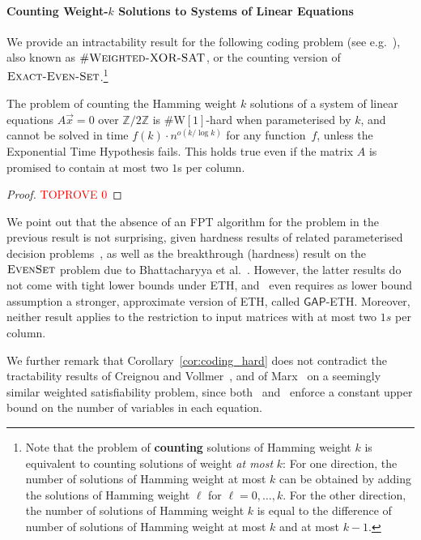\documentclass[authorcolumns,numberwithinsect]{no-lipics-v2022}
\newcommand{\W}{\mathrm{W}}
\begin{document}
\paragraph*{Counting Weight-$k$ Solutions to Systems of Linear Equations}
We provide an intractability result for the following coding problem (see e.g.\ \cite{BerlekampMT78,DowneyFVW99}), also known as $\#\textsc{Weighted-XOR-SAT}$, or the counting version of $\textsc{Exact-Even-Set}$.\footnote{Note that the problem of \textbf{counting} solutions of Hamming weight $k$ is equivalent to counting solutions of weight \emph{at most} $k$: For one direction, the number of solutions of Hamming weight at most $k$ can be obtained by adding the solutions of Hamming weight $\ell$ for $\ell=0,\dots,k$. For the other direction, the number of solutions of Hamming weight $k$ is equal to the difference of number of solutions of Hamming weight at most $k$ and at most $k-1$.} 

\begin{corollary}\label{cor:coding_hard}
    The problem of counting the Hamming weight $k$ solutions of a system of linear equations $A\vec{x}=0$ over $\mathbb{Z}/2\mathbb{Z}$ is $\#\W[1]$-hard when parameterised by $k$, and cannot be solved in time $f(k)\cdot n^{o(k/\log k)}$ for any function~$f$, unless the Exponential Time Hypothesis fails. This holds true even if the matrix $A$ is promised to contain at most two $1$s per column.
\end{corollary}
\begin{proof}\textcolor{red}{TOPROVE 0}\end{proof}
We point out that the absence of an FPT algorithm for the problem in the previous result is not surprising, given hardness results of related parameterised decision problems~\cite{DowneyFVW99}, as well as the breakthrough (hardness) result on the $\textsc{EvenSet}$ problem due to Bhattacharyya et al.\ \cite{BhattacharyyaGS18}. However, the latter results do not come with tight lower bounds under ETH, and~\cite{BhattacharyyaGS18} even requires as lower bound assumption a stronger, approximate version of ETH, called $\mathsf{GAP}$-ETH. Moreover, neither result applies to the restriction to input matrices with at most two $1s$ per column. 


We further remark that Corollary~\ref{cor:coding_hard} does not contradict the tractability results of Creignou and Vollmer~\cite{CreignouV15}, and of Marx~\cite{Marx05} on a seemingly similar weighted satisfiability problem, since both~\cite{CreignouV15} and~\cite{Marx05} enforce a constant upper bound on the number of variables in each equation.
\end{document}
